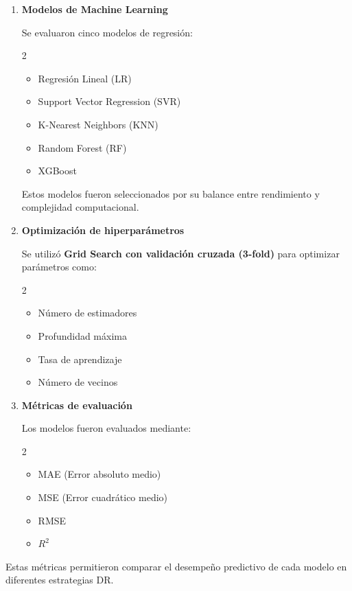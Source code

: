 \begin{enumerate}
    \item \textbf{Modelos de Machine Learning}

    Se evaluaron cinco modelos de regresión:
	\begin{multicols}{2}
    \begin{itemize}
        \item Regresión Lineal (LR)
        \item Support Vector Regression (SVR)
        \item K-Nearest Neighbors (KNN)
        \item Random Forest (RF)
        \item XGBoost
    \end{itemize}
	\end{multicols}

    Estos modelos fueron seleccionados por su balance entre rendimiento y complejidad computacional.

    \item \textbf{Optimización de hiperparámetros}

    Se utilizó \textbf{Grid Search con validación cruzada (3-fold)} para optimizar parámetros como:
	\begin{multicols}{2}
    \begin{itemize}
        \item Número de estimadores
        \item Profundidad máxima
        \item Tasa de aprendizaje
        \item Número de vecinos
    \end{itemize}
	\end{multicols}

    \item \textbf{Métricas de evaluación}

    Los modelos fueron evaluados mediante:
	\begin{multicols}{2}
    \begin{itemize}
        \item MAE (Error absoluto medio)
        \item MSE (Error cuadrático medio)
        \item RMSE
        \item $R^2$
    \end{itemize}
	\end{multicols}

\end{enumerate}

Estas métricas permitieron comparar el desempeño predictivo de cada modelo en diferentes estrategias DR.

